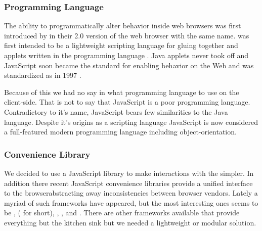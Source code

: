 \subsubsection{Programming Language}
\label{section:selection.stack.client.language}

The ability to programmatically alter behavior inside web browsers was first
introduced by  in their 2.0 version of the web browser
with the same name.  was first intended to be a
lightweight scripting language for gluing together  and applets
written in the  programming language \citep{netscape95}.%
Java applets never took off and JavaScript soon became the 
standard for enabling behavior on the Web and was standardized as
 in 1997 \citep{ecma99}.

Because of this we had no say in what programming language to use on the
client-side. That is not to say that JavaScript is a poor programming
language. Contradictory to it's name, JavaScript bears few similarities to the
Java language.%
Despite it's origins as a scripting language JavaScript is now considered
a full-featured modern programming language
 including object-orientation.

\subsubsection{Convenience Library}

We decided to use a JavaScript library to make interactions with the
 simpler.
In addition there recent JavaScript convenience libraries provide a
unified interface to the browser\dash{}abstracting away inconsistencies
between browser vendors. Lately a myriad of such frameworks have appeared,
but the most interesting ones seems to be
,
 ( for short),
,
, and
.%
There are other frameworks available that provide everything but the kitchen
sink but we needed a lightweight or modular solution.

